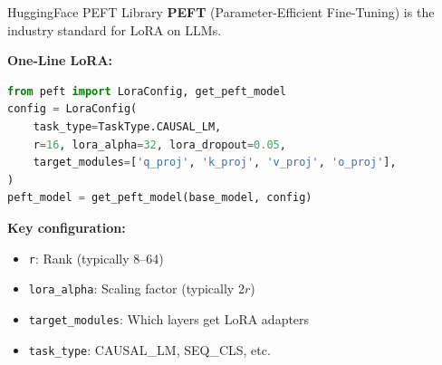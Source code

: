 \documentclass[aspectratio=169,10pt]{beamer}
\begin{document}
\begin{frame}[fragile]{HuggingFace PEFT Library}
	\textbf{PEFT} (Parameter-Efficient Fine-Tuning) is the industry standard for LoRA on LLMs.

	\vspace{0.3cm}
	\textbf{One-Line LoRA:}
	\begin{lstlisting}[language=Python]
from peft import LoraConfig, get_peft_model
config = LoraConfig(
    task_type=TaskType.CAUSAL_LM,
    r=16, lora_alpha=32, lora_dropout=0.05,
    target_modules=['q_proj', 'k_proj', 'v_proj', 'o_proj'],
)
peft_model = get_peft_model(base_model, config)
    \end{lstlisting}

	\vspace{0.2cm}
	\textbf{Key configuration:}
	\begin{itemize}
		\item \texttt{r}: Rank (typically 8--64)
		\item \texttt{lora\_alpha}: Scaling factor (typically $2r$)
		\item \texttt{target\_modules}: Which layers get LoRA adapters
		\item \texttt{task\_type}: CAUSAL\_LM, SEQ\_CLS, etc.
	\end{itemize}
\end{frame}
\end{document}
